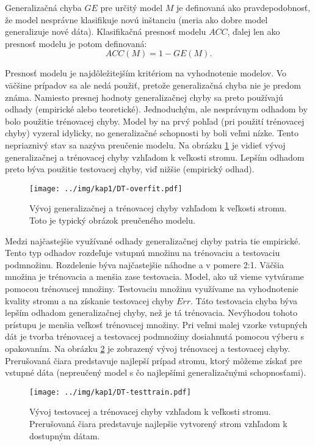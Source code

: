 Generalizačná chyba $GE$ pre určitý model $M$ je definovaná ako pravdepodobnosť, že model nesprávne klasifikuje novú inštanciu (meria ako dobre model generalizuje nové dáta). Klasifikačná presnosť modelu $ACC$, ďalej len ako presnosť modelu je potom definovaná:
\begin{equation}
ACC(M) = 1 - GE(M).
\end{equation}

Presnosť modelu je najdôležitejším kritériom na vyhodnotenie modelov. Vo väčšine prípadov sa ale nedá použiť, pretože generalizačná chyba nie je predom známa. Namiesto presnej hodnoty generalizačnej chyby sa preto používajú odhady (empirické alebo teoretické). Jednoduchým, ale nesprávnym odhadom by bolo použitie trénovacej chyby. Model by na prvý pohľad (pri použití trénovacej chyby) vyzeral idylicky, no generalizačné schopnosti by boli veľmi nízke. Tento nepriaznivý stav sa nazýva preučenie modelu. Na obrázku \ref{fig:overfit} je vidieť vývoj generalizačnej a trénovacej chyby vzhľadom k veľkosti stromu. Lepším odhadom preto býva použitie testovacej chyby, viď nižšie (empirický odhad).

\begin{figure}[h]
\centering
\centerline{\mbox{\texttt{[image: ../img/kap1/DT-overfit.pdf]}}}
\caption{Vývoj generalizačnej a trénovacej chyby vzhľadom k veľkosti stromu. Toto je typický obrázok preučeného modelu.}\label{fig:overfit}
\end{figure}

Medzi najčastejšie využívané odhady generalizačnej chyby patria tie empirické. Tento typ odhadov rozdeľuje vstupnú množinu na trénovaciu a testovaciu podmnožinu. Rozdelenie býva najčastejšie náhodne a v pomere 2:1. Väčšia množina je trénovacia a menšia zase testovacia. 
Model, ako už vieme vytvárame pomocou trénovacej množiny. Testovaciu množinu využívame na vyhodnotenie kvality stromu a na získanie testovacej chyby $Err$. Táto testovacia chyba býva lepším odhadom generalizačnej chyby, než je tá trénovacia. Nevýhodou tohoto prístupu je menšia veľkosť trénovacej množiny. Pri veľmi malej vzorke vstupných dát je tvorba trénovacej a testovacej podmnožiny dosiahnutá pomocou výberu s opakovaním. Na obrázku \ref{fig:testtrain} je zobrazený vývoj trénovacej a testovacej chyby. Prerušovaná čiara predstavuje najlepší prípad stromu, ktorý môžeme získať pre vstupné dáta (nepreučený model s čo najlepšími generalizačnými schopnosťami).

\begin{figure}[h]
\centering
\centerline{\mbox{\texttt{[image: ../img/kap1/DT-testtrain.pdf]}}}
\caption{Vývoj testovacej a trénovacej chyby vzhľadom k veľkosti stromu. Prerušovaná čiara predstavuje najlepšie vytvorený strom vzhľadom k dostupným dátam.}\label{fig:testtrain}
\end{figure}

